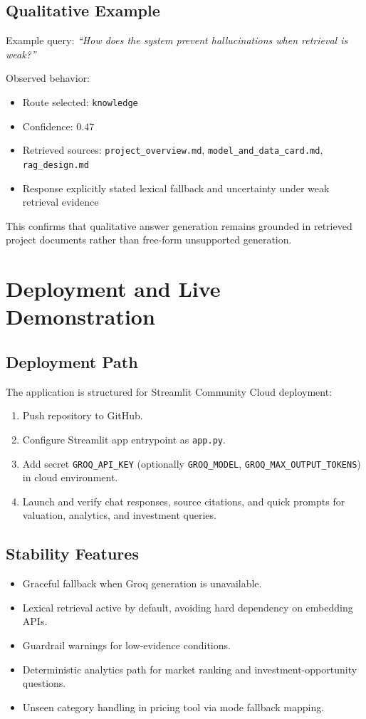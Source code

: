 \documentclass[12pt,a4paper]{article}
\begin{document}
\subsection{Qualitative Example}
Example query: \emph{``How does the system prevent hallucinations when retrieval is weak?''}

Observed behavior:
\begin{itemize}[leftmargin=1.6em]
  \item Route selected: \texttt{knowledge}
  \item Confidence: 0.47
  \item Retrieved sources: \texttt{project\_overview.md}, \texttt{model\_and\_data\_card.md}, \texttt{rag\_design.md}
  \item Response explicitly stated lexical fallback and uncertainty under weak retrieval evidence
\end{itemize}

This confirms that qualitative answer generation remains grounded in retrieved project documents rather than free-form unsupported generation.

\section{Deployment and Live Demonstration}
\subsection{Deployment Path}
The application is structured for Streamlit Community Cloud deployment:
\begin{enumerate}[leftmargin=1.8em]
  \item Push repository to GitHub.
  \item Configure Streamlit app entrypoint as \texttt{app.py}.
  \item Add secret \texttt{GROQ\_API\_KEY} (optionally \texttt{GROQ\_MODEL}, \texttt{GROQ\_MAX\_OUTPUT\_TOKENS}) in cloud environment.
  \item Launch and verify chat responses, source citations, and quick prompts for valuation, analytics, and investment queries.
\end{enumerate}

\subsection{Stability Features}
\begin{itemize}[leftmargin=1.6em]
  \item Graceful fallback when Groq generation is unavailable.
  \item Lexical retrieval active by default, avoiding hard dependency on embedding APIs.
  \item Guardrail warnings for low-evidence conditions.
  \item Deterministic analytics path for market ranking and investment-opportunity questions.
  \item Unseen category handling in pricing tool via mode fallback mapping.
\end{itemize}
\end{document}
